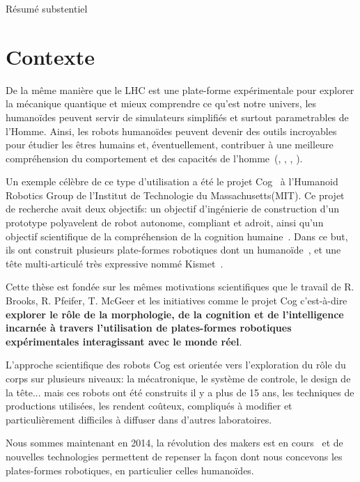 {Résumé substentiel}


\section*{Contexte} %

De la même manière que le LHC est une plate-forme expérimentale pour explorer la mécanique quantique et mieux comprendre ce qu’est notre univers, les humanoïdes peuvent servir de simulateurs simplifiés et surtout parametrables de l'Homme. Ainsi, les robots humanoïdes peuvent devenir des outils incroyables pour étudier les êtres humains et, éventuellement, contribuer à une meilleure compréhension du comportement et des capacités de l’homme~(\cite{atkeson2000using}, \cite{cheng2007cb}, \cite{brooks1986achieving}, \cite{oudeyer2010impact}).

Un exemple célèbre de ce type  d’utilisation a été le projet Cog~\parencite{brooks1999cog} à l'Humanoid Robotics Group de l'Institut de Technologie du Massachusetts(MIT). Ce projet de recherche avait deux objectifs: un objectif d'ingénierie de construction d'un prototype polyavelent de robot autonome, compliant et adroit, ainsi qu’un objectif scientifique de la compréhension de la cognition humaine~\parencite{brooks1994building}. Dans ce but, ils ont construit plusieurs plate-formes robotiques dont un humanoïde~\parencite{brooks1999cog}, et une tête multi-articulé très expressive nommé Kismet~\parencite{breazeal2003emotion}.

Cette thèse est fondée sur les mêmes motivations scientifiques que le travail de R. Brooks, R. Pfeifer, T. McGeer et les initiatives comme le projet Cog c’est-à-dire \textbf{explorer le rôle de la morphologie, de la cognition et de l'intelligence incarnée à travers l'utilisation de plates-formes robotiques expérimentales interagissant avec le monde réel}.

L'approche scientifique des robots Cog est orientée vers l'exploration du rôle du corps sur plusieurs niveaux: la mécatronique, le système de controle, le design de la tête...  mais ces robots ont été construits il y a plus de 15 ans, les techniques de productions utilisées, les rendent coûteux, compliqués à modifier et particulièrement difficiles à diffuser dans d'autres laboratoires.

Nous sommes maintenant en 2014, la révolution des makers est en cours~\parencite{anderson2012makers} et de nouvelles technologies permettent de repenser la façon dont nous concevons les plates-formes robotiques, en particulier celles humanoïdes.


